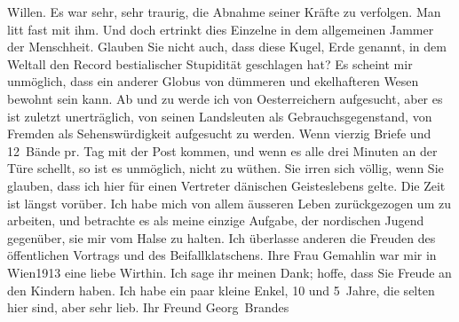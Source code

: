 \begin{ledgroupsized}[t]{13cm}
               Willen.\pend
           \pstart
           Es war sehr, sehr traurig, die Abnahme seiner Kräfte zu verfolgen. Man litt fast mit
               ihm.\pend
           \pstart
           Und doch ertrinkt dies Einzelne in dem allgemeinen Jammer der Menschheit. Glauben Sie
               nicht  auch, dass diese Kugel, Erde genannt, in dem
               Weltall den Record bestialischer Stupidität geschlagen hat? Es scheint mir unmöglich,
               dass ein anderer Globus von dümmeren und ekelhafteren Wesen bewohnt sein kann.\pend
           \pstart
           Ab und zu werde ich von Oesterreichern
               aufgesucht, aber es ist zuletzt unerträglich, von seinen Landsleuten als
               Gebrauchsgegenstand, {\pb}von Fremden
               als Sehenswürdigkeit aufgesucht zu werden. Wenn vierzig Briefe und 12 Bände pr. Tag
                   mit der Post \introOben{}kommen,\introOben{} und wenn es alle drei Minuten an der Türe schellt, so ist es
               unmöglich, nicht zu wüthen.\pend
           \pstart
           Sie irren sich völlig, wenn Sie glauben, dass ich hier für einen Vertreter dänischen Geisteslebens gelte. Die Zeit ist
               längst vorüber. Ich habe mich von allem äusseren Leben zurückgezogen um zu arbeiten,
               und betrachte es als meine einzige Aufgabe, der nordischen Jugend gegenüber, sie mir vom Halse zu halten. Ich überlasse
               anderen die Freuden des öffentlichen Vortrags und des Beifallklatschens.\pend
           \pstart
           Ihre Frau Gemahlin war mir in
                  Wien1913 eine liebe Wirthin. Ich sage ihr meinen Dank; hoffe, dass Sie
               Freude an den Kindern haben. Ich habe ein paar kleine Enkel, 10 und 5 Jahre, die selten hier sind, aber sehr lieb.\pend
           \pstart Ihr Freund \spacefill\mbox{Georg Brandes}\pend{}
         
         \endnumbering{}\end{ledgroupsized}  \newcommand{\dateiname}{L02303}\newcommand{\titel}{Georg Brandes an Arthur Schnitzler, 18. 9. 1918}\newcommand{\editorInnen}{Martin Anton Müller und Gerd-Hermann Susen}
      